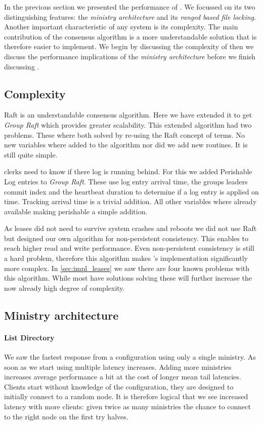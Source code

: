 In the previous section we presented the performance of \name{}. We focussed on its two distinguishing features: the \textit{ministry architecture} and its \textit{ranged based file locking}. Another important characteristic of any system is its complexity. The main contribution of the \raft{} consensus algorithm is a more understandable solution that is therefore easier to implement. We begin by discussing the complexity of \name{} then we discuss the performance implications of the \textit{ministry architecture} before we finish discussing .
%
\subsection{Complexity}
Raft is an understandable consensus algorithm. Here we have extended it to get \textit{Group Raft} which provides greater scalability. This extended algorithm had two problems. These where both solved by re-using the Raft concept of terms. No new variables where added to the algorithm nor did we add new routines. It is still quite simple. 

\Name{} clerks need to know if there log is running behind. For this we added Perishable Log entries to \textit{Group Raft}. These use log entry arrival time, the groups leaders commit index and the heartbeat duration to determine if a log entry is applied on time. Tracking arrival time is a trivial addition. All other variables where already available making perishable a simple addition.

As leases did not need to survive system crashes and reboots we did not use Raft but designed our own algorithm for non-persistent consistency. This enables \name{} to reach higher read and write performance. Even non-persistent consistency is still a hard problem, therefore this algorithm makes \name{}'s implementation significantly more complex. In \cref{sec:impl_leases} we saw there are four known problems with this algorithm. While most have solutions solving these will further increase the now already high degree of complexity.
%
\subsection{Ministry architecture}
\paragraph{List Directory}
We saw the fastest response from a \name{} configuration using only a single ministry. As soon as we start using multiple latency increases. Adding more ministries increases average performance a bit at the cost of longer mean tail latencies. Clients start without knowledge of the configuration, they are designed to initially connect to a random node. It is therefore logical that we see increased latency with more clients: given twice as many ministries the chance to connect to the right node on the first try halves. 

